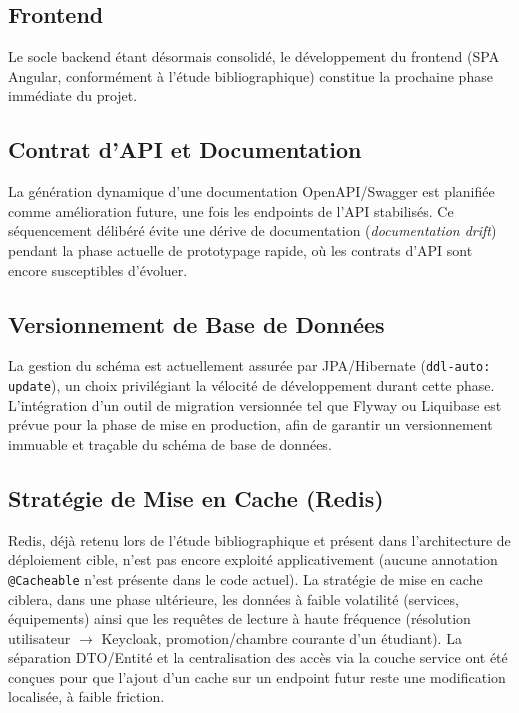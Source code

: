\documentclass[a4paper,12pt]{article}
\begin{document}
\subsection{Frontend}
Le socle backend étant désormais consolidé, le développement du frontend (SPA Angular, conformément à l'étude bibliographique) constitue la prochaine phase immédiate du projet.

\subsection{Contrat d'API et Documentation}
La génération dynamique d'une documentation OpenAPI/Swagger est planifiée comme amélioration future, une fois les endpoints de l'API stabilisés. Ce séquencement délibéré évite une dérive de documentation (\textit{documentation drift}) pendant la phase actuelle de prototypage rapide, où les contrats d'API sont encore susceptibles d'évoluer.

\subsection{Versionnement de Base de Données}
La gestion du schéma est actuellement assurée par JPA/Hibernate (\texttt{ddl-auto: update}), un choix privilégiant la vélocité de développement durant cette phase. L'intégration d'un outil de migration versionnée tel que Flyway ou Liquibase est prévue pour la phase de mise en production, afin de garantir un versionnement immuable et traçable du schéma de base de données.

\subsection{Stratégie de Mise en Cache (Redis)}
Redis, déjà retenu lors de l'étude bibliographique et présent dans l'architecture de déploiement cible, n'est pas encore exploité applicativement (aucune annotation \texttt{@Cacheable} n'est présente dans le code actuel). La stratégie de mise en cache ciblera, dans une phase ultérieure, les données à faible volatilité (services, équipements) ainsi que les requêtes de lecture à haute fréquence (résolution utilisateur $\rightarrow$ Keycloak, promotion/chambre courante d'un étudiant). La séparation DTO/Entité et la centralisation des accès via la couche service ont été conçues pour que l'ajout d'un cache sur un endpoint futur reste une modification localisée, à faible friction.

\newpage
\end{document}
